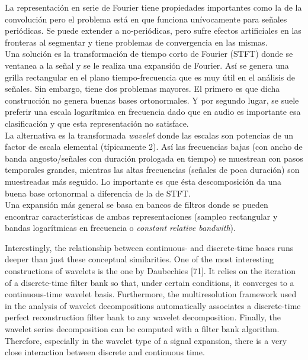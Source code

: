 		La representación en serie de Fourier tiene propiedades importantes como la de la convolución pero el problema está en que funciona unívocamente para señales periódicas. Se puede extender a no-periódicas, pero sufre efectos artificiales en las fronteras al segmentar y tiene problemas de convergencia en las mismas.\\
		
		Una solución es la transformación de tiempo corto de Fourier (STFT) donde se ventanea a la señal y se le realiza una expansión de Fourier. Así se genera una grilla rectangular en el plano tiempo-frecuencia que es muy útil en el análisis de señales. Sin embargo, tiene dos problemas mayores. El primero es que dicha construcción no genera buenas bases ortonormales. Y por segundo lugar, se suele preferir una escala logarítmica en frecuencia dado que en audio es importante esa clasificación y que esta representación no satisface.\\

		La alternativa es la transformada \emph{wavelet} donde las escalas son potencias de un factor de escala elemental (típicamente 2). Así las frecuencias bajas (con ancho de banda angosto/señales con duración prologada en tiempo) se muestrean con pasos temporales grandes, mientras las altas frecuencias (señales de poca duración) son muestreadas más seguido. Lo importante es que ésta descomposición da una buena base ortonormal a diferencia de la de STFT.\\

		Una expansión más general se basa en bancos de filtros donde se pueden encontrar características de ambas representaciones (sampleo rectangular y bandas logarítmicas en frecuencia o \emph{constant relative bandwith}).

		Interestingly, the relationship between continuous- and discrete-time bases runs
		deeper than just these conceptual similarities. One of the most interesting constructions of wavelets is the one by Daubechies [71]. It relies on the iteration
		of a discrete-time filter bank so that, under certain conditions, it converges to a
		continuous-time wavelet basis. Furthermore, the multiresolution framework used
		in the analysis of wavelet decompositions automatically associates a discrete-time
		perfect reconstruction filter bank to any wavelet decomposition. Finally, the wavelet series decomposition can be computed with a filter bank algorithm. Therefore,
		especially in the wavelet type of a signal expansion, there is a very close interaction
		between discrete and continuous time.


